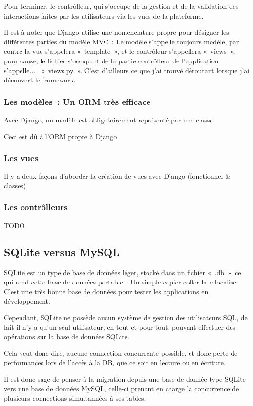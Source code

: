\documentclass{report}
\begin{document}
Pour terminer, le contrôlleur, qui s'occupe de la gestion et de la validation des interactions faites par les utilisateurs via les vues de la plateforme.

Il est à noter que Django utilise une nomenclature propre pour désigner les différentes parties du modèle MVC : Le modèle s'appelle toujours modèle, par contre la vue s'appelera « template », et le contrôleur s'appellera « views », pour cause, le fichier s'occupant de la partie contrôlleur de l'application s'appelle...  « views.py ». C'est d'ailleurs ce que j'ai trouvé déroutant lorsque j'ai découvert le framework.

\subsubsection{Les modèles : Un ORM très efficace}
Avec Django, un modèle est obligatoirement représenté par une classe.

Ceci est dû à l'ORM propre à Django

\subsubsection{Les vues}
Il y a deux façons d'aborder la création de vues avec Django (fonctionnel & classes)

\subsubsection{Les contrôlleurs}
TODO

\subsection{SQLite versus MySQL}
SQLite est un type de base de données léger, stocké dans un fichier « .db », ce qui rend cette base de données portable : Un simple copier-coller la relocalise. C'est une très bonne base de données pour tester les applications en développement.

Cependant, SQLite ne possède aucun système de gestion des utilisateurs SQL, de fait il n'y a qu'un seul utilisateur, en tout et pour tout, pouvant effectuer des opérations sur la base de données SQLite.

Cela veut donc dire, aucune connection concurrente possible, et donc perte de performances lors de l'accès à la DB, que ce soit en lecture ou en écriture.

Il est donc sage de penser à la migration depuis une base de donnée type SQLite vers une base de données MySQL, celle-ci prenant en charge la concurrence de plusieurs connections simultannées à ses tables.
\end{document}
